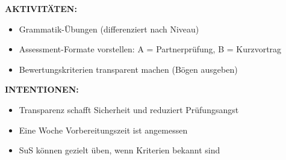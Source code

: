 \documentclass[11pt, a4paper]{article}
\begin{document}
\begin{dsbox}[title={DS 3 -- Bucharbeit + Assessment-Ankündigung (Mo, 12.01.2026)}]
\vspace{0.2cm}

\textbf{AKTIVITÄTEN:}
\begin{itemize}[leftmargin=1.5em, nosep]
    \item Grammatik-Übungen (differenziert nach Niveau)
    \item Assessment-Formate vorstellen: A = Partnerprüfung, B = Kurzvortrag
    \item Bewertungskriterien transparent machen (Bögen ausgeben)
\end{itemize}

\vspace{0.2cm}

\textbf{INTENTIONEN:}
\begin{itemize}[leftmargin=1.5em, nosep]
    \item Transparenz schafft Sicherheit und reduziert Prüfungsangst
    \item Eine Woche Vorbereitungszeit ist angemessen
    \item SuS können gezielt üben, wenn Kriterien bekannt sind
\end{itemize}

\end{dsbox}

\vspace{0.4cm}
\end{document}
